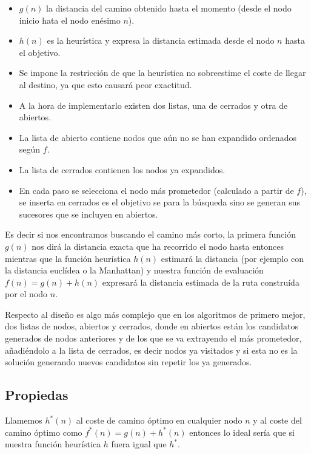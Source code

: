 \documentclass[12 pt, a4paper]{article}
\begin{document}
\begin{itemize}
  \item $g(n)$ la distancia del camino obtenido hasta el momento (desde el nodo inicio hata el nodo enésimo $n$). 
  \item $h(n)$ es la heurística y expresa la distancia estimada desde el nodo $n$ hasta el objetivo. 
  \item Se impone la restricción de que la heurística no sobreestime el coste de llegar al destino, ya que esto
  causará peor exactitud. 
  \item A la hora de implementarlo existen dos listas, una de cerrados y otra de abiertos. 
  \item La lista de abierto contiene nodos que aún no se han expandido ordenados según $f$. 
  \item La lista de cerrados contienen los nodos ya expandidos. 
  \item En cada paso se selecciona el nodo más prometedor (calculado a partir de $f$), se inserta en cerrados 
  es el objetivo se para la búsqueda sino se generan sus sucesores que se incluyen en abiertos. 
  
  
\end{itemize}

Es decir si nos encontramos buscando el camino más corto, la primera función $g(n)$ nos dirá la distancia 
exacta que ha recorrido el nodo hasta entonces mientras que la función heurística $h(n)$ estimará la distancia 
(por ejemplo con la distancia euclídea o la Manhattan) y nuestra función de evaluación 
$f(n) = g(n)+h(n)$  expresará la distancia estimada de la ruta construída por el nodo $n$.

Respecto al diseño es algo más complejo que en los algoritmos de primero mejor, 
dos listas de nodos, abiertos y cerrados, donde en abiertos están los candidatos generados de nodos anteriores y de los que 
se va extrayendo el más prometedor, añadiéndolo a la lista de cerrados, es decir nodos ya visitados y si esta no es la 
solución generando nuevos candidatos sin repetir los ya generados. 

\subsection{Propiedas}

Llamemos $h^*(n)$ al coste de camino óptimo en cualquier nodo $n$ y al coste del camino óptimo como 
$f^*(n) = g(n)+ h^*(n)$ entonces lo ideal sería que si nuestra función heurística $h$ fuera igual que $h^*$.
\end{document}
